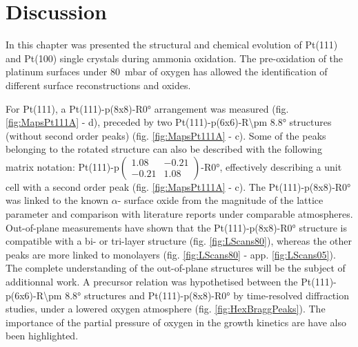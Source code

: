 \section{Discussion}

In this chapter was presented the structural and chemical evolution of Pt(111) and Pt(100) single crystals during ammonia oxidation.
The pre-oxidation of the platinum surfaces under \qty{80}{\milli\bar} of oxygen has allowed the identification of different surface reconstructions and oxides.

For Pt(111), a Pt(111)-p(8x8)-R\ang{0} arrangement was measured (fig. \ref{fig:MapsPt111A} - d), preceded by two Pt(111)-p(6x6)-R\ang{\pm 8.8} structures (without second order peaks) (fig. \ref{fig:MapsPt111A} - c).
Some of the peaks belonging to the rotated structure can also be described with the following matrix notation: Pt(111)-p$\begin{pmatrix} 1.08 & -0.21 \\ -0.21 & 1.08 \end{pmatrix}$-R\ang{0}, effectively describing a unit cell with a second order peak (fig. \ref{fig:MapsPt111A} - c).
The Pt(111)-p(8x8)-R\ang{0} was linked to the known $\alpha$- surface oxide from the magnitude of the lattice parameter and comparison with literature reports under comparable atmospheres.
Out-of-plane measurements have shown that the Pt(111)-p(8x8)-R\ang{0} structure is compatible with a bi- or tri-layer structure (fig. \ref{fig:LScans80}), whereas the other peaks are more linked to monolayers (fig. \ref{fig:LScans80} - app. \ref{fig:LScans05}).
The complete understanding of the out-of-plane structures will be the subject of additionnal work.
A precursor relation was hypothetised between the Pt(111)-p(6x6)-R\ang{\pm 8.8} structures and Pt(111)-p(8x8)-R\ang{0} by time-resolved diffraction studies, under a lowered oxygen atmosphere (fig. \ref{fig:HexBraggPeaks}).
The importance of the partial pressure of oxygen in the growth kinetics are have also been highlighted.

